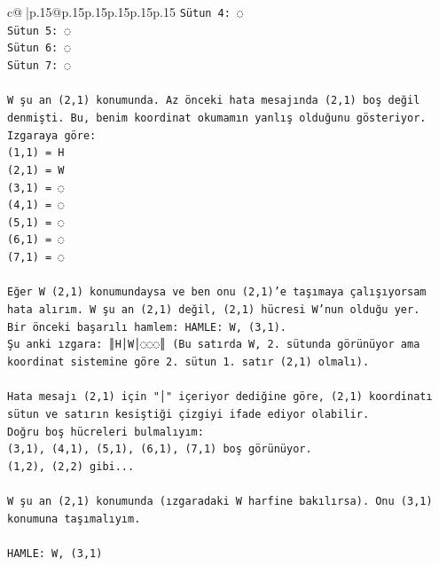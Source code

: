 \documentclass{article}
\begin{document}
{\begin{supertabular}{c@{$\;$}|p{.15\linewidth}@{}p{.15\linewidth}p{.15\linewidth}p{.15\linewidth}p{.15\linewidth}p{.15\linewidth}}
{{{\texttt{Sütun 4: ◌} \\
\texttt{Sütun 5: ◌} \\
\texttt{Sütun 6: ◌} \\
\texttt{Sütun 7: ◌} \\
\\ 
\texttt{W şu an (2,1) konumunda. Az önceki hata mesajında (2,1) boş değil denmişti. Bu, benim koordinat okumamın yanlış olduğunu gösteriyor. } \\
\texttt{Izgaraya göre:} \\
\texttt{(1,1) = H} \\
\texttt{(2,1) = W} \\
\texttt{(3,1) = ◌} \\
\texttt{(4,1) = ◌} \\
\texttt{(5,1) = ◌} \\
\texttt{(6,1) = ◌} \\
\texttt{(7,1) = ◌} \\
\\ 
\texttt{Eğer W (2,1) konumundaysa ve ben onu (2,1)'e taşımaya çalışıyorsam hata alırım. W şu an (2,1) değil, (2,1) hücresi W'nun olduğu yer. } \\
\texttt{Bir önceki başarılı hamlem: HAMLE: W, (3,1). } \\
\texttt{Şu anki ızgara: ║H│W│◌◌◌║ (Bu satırda W, 2. sütunda görünüyor ama koordinat sistemine göre 2. sütun 1. satır (2,1) olmalı).} \\
\\ 
\texttt{Hata mesajı (2,1) için "│" içeriyor dediğine göre, (2,1) koordinatı sütun ve satırın kesiştiği çizgiyi ifade ediyor olabilir. } \\
\texttt{Doğru boş hücreleri bulmalıyım:} \\
\texttt{(3,1), (4,1), (5,1), (6,1), (7,1) boş görünüyor.} \\
\texttt{(1,2), (2,2) gibi...} \\
\\ 
\texttt{W şu an (2,1) konumunda (ızgaradaki W harfine bakılırsa). Onu (3,1) konumuna taşımalıyım.} \\
\\ 
\texttt{HAMLE: W, (3,1)} \\
            }
        }
    }
     \\ \\


\end{supertabular}}
\end{document}
